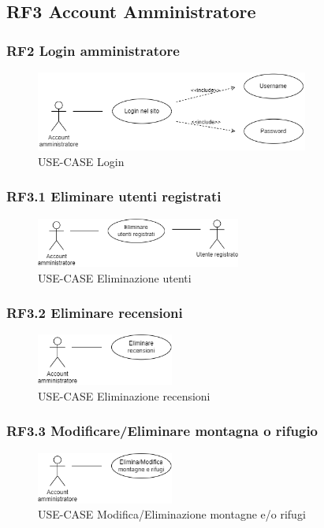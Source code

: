 \documentclass[a4paper,12pt]{article}
\begin{document}
\subsection*{RF3 Account Amministratore}
\subsubsection*{RF2 Login amministratore}
\begin{figure}[H]
   \centering
   \includegraphics[width=0.8\textwidth]{img-D2/login_amministratore.png}
    \caption{USE-CASE Login}
\end{figure}

\subsubsection*{RF3.1 Eliminare utenti registrati}
\begin{figure}[H]
   \centering
   \includegraphics[width=0.6\textwidth]{img-D2/eliminazione_utenti.png}
    \caption{USE-CASE Eliminazione utenti}
\end{figure}

\subsubsection*{RF3.2 Eliminare recensioni}
\begin{figure}[H]
   \centering
   \includegraphics[width=0.4\textwidth]{img-D2/eliminazione_recensioni.png}
    \caption{USE-CASE Eliminazione recensioni}
\end{figure}

\subsubsection*{RF3.3 Modificare/Eliminare montagna o rifugio}
\begin{figure}[H]
   \centering
   \includegraphics[width=0.4\textwidth]{img-D2/m_e_montagna_rifugio.png}
    \caption{USE-CASE Modifica/Eliminazione montagne e/o rifugi}
\end{figure}
\end{document}
